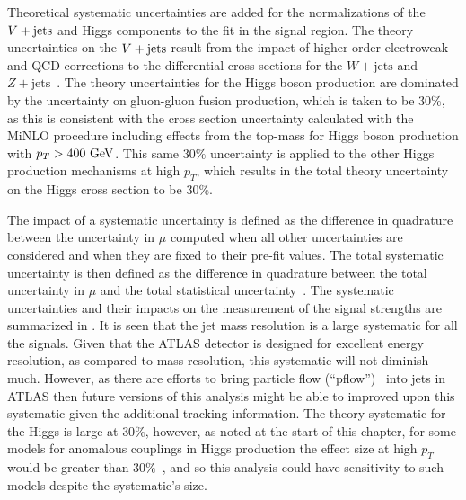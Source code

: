 Theoretical systematic uncertainties are added for the normalizations of the $V + \text{jets}$ and Higgs components to the fit in the signal region.
The theory uncertainties on the $V + \text{jets}$ result from the impact of higher order electroweak and QCD corrections to the differential cross sections for the $W+\mathrm{jets}$ and $Z+\mathrm{jets}$~\cite{Lindert:2017olm}.
The theory uncertainties for the Higgs boson production are dominated by the uncertainty on gluon-gluon fusion production, which is taken to be $30\%$, as this is consistent with the cross section uncertainty calculated with the MiNLO procedure including effects from the top-mass for Higgs boson production with $p_{T}> 400~\mathrm{GeV}$.
This same $30\%$ uncertainty is applied to the other Higgs production mechanisms at high $p_{T}$, which results in the total theory uncertainty on the Higgs cross section to be $30\%$.

The impact of a systematic uncertainty is defined as the difference in quadrature between the uncertainty in $\mu$ computed when all other uncertainties are considered and when they are fixed to their pre-fit values.
The total systematic uncertainty is then defined as the difference in quadrature between the total uncertainty in $\mu$ and the total statistical uncertainty~\cite{ATLAS-CONF-2018-052}.
The systematic uncertainties and their impacts on the measurement of the signal strengths are summarized in .
It is seen that the jet mass resolution is a large systematic for all the signals.
Given that the ATLAS detector is designed for excellent energy resolution, as compared to mass resolution, this systematic will not diminish much.
However, as there are efforts to bring particle flow (``pflow'')~\cite{PERF-2015-09} into \largeR{} jets in ATLAS then future versions of this analysis might be able to improved upon this systematic given the additional tracking information.
The theory systematic for the Higgs is large at $30\%$, however, as noted at the start of this chapter, for some models for anomalous couplings in Higgs production the effect size at high $p_{T}$ would be greater than $30\%$~\cite{Grojean:2013nya,Dawson:2015gka}, and so this analysis could have sensitivity to such models despite the systematic's size.

